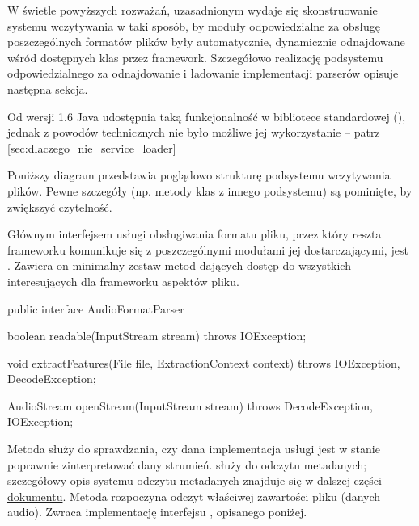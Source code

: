 W świetle powyższych rozważań, uzasadnionym wydaje się skonstruowanie systemu wczytywania w taki
sposób, by moduły odpowiedzialne za obsługę poszczególnych formatów plików były automatycznie,
dynamicznie odnajdowane wśród dostępnych klas przez framework. Szczegółowo realizację podsystemu
odpowiedzialnego za odnajdowanie i ładowanie implementacji parserów opisuje
\hyperref[sec:odnajdywanie_implementacji]{następna sekcja}.

\begin{Note}
Od wersji 1.6 Java udostępnia taką funkcjonalność w bibliotece standardowej (),
jednak z powodów technicznych nie było możliwe jej wykorzystanie -- patrz
\ref{sec:dlaczego_nie_service_loader}
\end{Note}

\bigskip

Poniższy diagram przedstawia poglądowo strukturę podsystemu wczytywania plików. Pewne szczegóły (np.
metody klas z innego podsystemu) są pominięte, by zwiększyć czytelność.


Głównym interfejsem usługi obsługiwania formatu pliku, przez który reszta frameworku komunikuje się
z poszczególnymi modułami jej dostarczającymi, jest . Zawiera on minimalny
zestaw metod dających dostęp do wszystkich interesujących dla frameworku aspektów pliku.

\begin{java}
public interface AudioFormatParser {

    boolean readable(InputStream stream) throws IOException;

    void extractFeatures(File file, ExtractionContext context) throws IOException, DecodeException;

    AudioStream openStream(InputStream stream) throws DecodeException, IOException;

}
\end{java}

Metoda  służy do sprawdzania, czy dana implementacja usługi jest w stanie poprawnie
zinterpretować dany strumień.  służy do odczytu metadanych; szczegółowy opis
systemu odczytu metadanych znajduje się \hyperref[sec:metadane]{w dalszej części dokumentu}. Metoda
 rozpoczyna odczyt właściwej zawartości pliku (danych audio). Zwraca implementację
interfejsu , opisanego poniżej.

